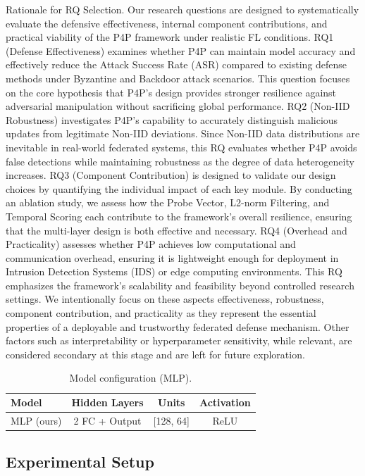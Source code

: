 Rationale for RQ Selection. Our research questions are designed to systematically evaluate the defensive effectiveness, internal component contributions, and practical viability of the P4P framework under realistic FL conditions.
RQ1 (Defense Effectiveness) examines whether P4P can maintain model accuracy and effectively reduce the Attack Success Rate (ASR) compared to existing defense methods under Byzantine and Backdoor attack scenarios. This question focuses on the core hypothesis that P4P’s design provides stronger resilience against adversarial manipulation without sacrificing global performance.
RQ2 (Non-IID Robustness) investigates P4P’s capability to accurately distinguish malicious updates from legitimate Non-IID deviations. Since Non-IID data distributions are inevitable in real-world federated systems, this RQ evaluates whether P4P avoids false detections while maintaining robustness as the degree of data heterogeneity increases.
RQ3 (Component Contribution) is designed to validate our design choices by quantifying the individual impact of each key module. By conducting an ablation study, we assess how the Probe Vector, L2-norm Filtering, and Temporal Scoring each contribute to the framework's overall resilience, ensuring that the multi-layer design is both effective and necessary.
RQ4 (Overhead and Practicality) assesses whether P4P achieves low computational and communication overhead, ensuring it is lightweight enough for deployment in Intrusion Detection Systems (IDS) or edge computing environments. This RQ emphasizes the framework’s scalability and feasibility beyond controlled research settings.
We intentionally focus on these aspects effectiveness, robustness, component contribution, and practicality as they represent the essential properties of a deployable and trustworthy federated defense mechanism. Other factors such as interpretability or hyperparameter sensitivity, while relevant, are considered secondary at this stage and are left for future exploration.

\begin{table}[t]
\centering
\caption{Model configuration (MLP).}
\label{tab:model_config}
\begin{tabular}{lccc}
\toprule
Model & Hidden Layers & Units & Activation\\
\midrule
MLP (ours) & 2 FC + Output & [128, 64] & ReLU \\
\bottomrule
\end{tabular}
\end{table}

\subsection{Experimental Setup}
